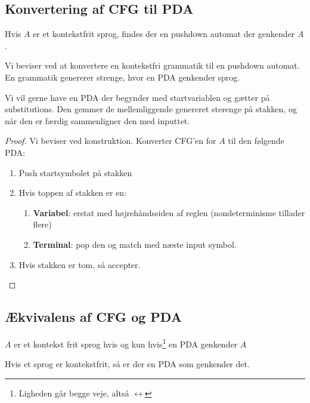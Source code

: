 \subsection{Konvertering af CFG til PDA}%
\label{subsec:pdacfgconvert}
\begin{theorem}
  \label{teo:pdacfgconvert}
Hvis $A$ er et kontekstfrit sprog, findes der en pushdown automat der genkender $A$.
\end{theorem}

Vi beviser ved at konvertere en kontekstfri grammatik til en pushdown automat. En grammatik genererer strenge, hvor en PDA genkender sprog.

Vi vil gerne have en PDA der begynder med startvariablen og gætter på substitutions. Den gemmer de mellemliggende genereret sterenge på stakken, og når den er færdig sammenligner den med inputtet.


\begin{proof}
  Vi beviser ved konstruktion. Konverter CFG'en for $A$ til den følgende PDA:
  \begin{enumerate}
    \item Push startsymbolet på stakken
    \item Hvis toppen af stakken er en:
          \begin{enumerate}
            \item \textbf{Variabel}: erstat med højrehåndssiden af reglen (nondeterminisme tillader flere)
            \item \textbf{Terminal}: pop den og match med næste input symbol.
          \end{enumerate}
    \item Hvis stakken er tom, så accepter.
  \end{enumerate}
\end{proof}


\subsection{Ækvivalens af CFG og PDA}%
\label{subsec:cfgpdaequiv}

\begin{theorem}
$A$ er et kontekst frit sprog hvis og kun hvis\footnote{Ligheden går begge veje, altså $\leftrightarrow$} en PDA genkender $A$
\end{theorem}

\begin{lemma}
Hvis et sprog er kontekstfrit, så er der en PDA som genkender det.
\end{lemma}

